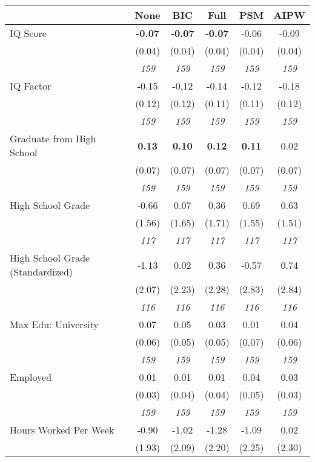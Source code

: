 \begin{tabular}{l c c c c c}
\toprule
 & None & BIC & Full & PSM & AIPW \\
\midrule
IQ Score & \textbf{ -0.07 } & \textbf{ -0.07 } & \textbf{ -0.07 } & -0.06 & -0.09 \\
& (0.04) & (0.04) & (0.04) & (0.04) & (0.04) \\
& \textit{ 159 } & \textit{ 159 } & \textit{ 159 } & \textit{ 159 } & \textit{ 159 } \\
IQ Factor & -0.15 & -0.12 & -0.14 & -0.12 & -0.18 \\
& (0.12) & (0.12) & (0.11) & (0.11) & (0.12) \\
& \textit{ 159 } & \textit{ 159 } & \textit{ 159 } & \textit{ 159 } & \textit{ 159 } \\
Graduate from High School & \textbf{ 0.13 } & \textbf{ 0.10 } & \textbf{ 0.12 } & \textbf{0.11} & 0.02 \\
& (0.07) & (0.07) & (0.07) & (0.07) & (0.07) \\
& \textit{ 159 } & \textit{ 159 } & \textit{ 159 } & \textit{ 159 } & \textit{ 159 } \\
High School Grade & -0.66 & 0.07 & 0.36 & 0.69 & 0.63 \\
& (1.56) & (1.65) & (1.71) & (1.55) & (1.51) \\
& \textit{ 117 } & \textit{ 117 } & \textit{ 117 } & \textit{ 117 } & \textit{ 117 } \\
High School Grade (Standardized) & -1.13 & 0.02 & 0.36 & -0.57 & 0.74 \\
& (2.07) & (2.23) & (2.28) & (2.83) & (2.84) \\
& \textit{ 116 } & \textit{ 116 } & \textit{ 116 } & \textit{ 116 } & \textit{ 116 } \\
Max Edu: University & 0.07 & 0.05 & 0.03 & 0.01 & 0.04 \\
& (0.06) & (0.05) & (0.05) & (0.07) & (0.06) \\
& \textit{ 159 } & \textit{ 159 } & \textit{ 159 } & \textit{ 159 } & \textit{ 159 } \\
Employed & 0.01 & 0.01 & 0.01 & 0.04 & 0.03 \\
& (0.03) & (0.04) & (0.04) & (0.05) & (0.03) \\
& \textit{ 159 } & \textit{ 159 } & \textit{ 159 } & \textit{ 159 } & \textit{ 159 } \\
Hours Worked Per Week & -0.90 & -1.02 & -1.28 & -1.09 & 0.02 \\
& (1.93) & (2.09) & (2.20) & (2.25) & (2.30) \\

\end{tabular}
